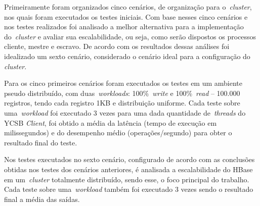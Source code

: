 \documentclass[12pt]{article}
\begin{document}

Primeiramente foram organizados cinco cenários, de organização para o~\emph{cluster}, nos quais foram executados os testes iniciais. Com base nesses cinco cenários e nos testes realizados foi analisado a melhor alternativa para a implementação do~\emph{cluster} e avaliar sua escalabilidade, ou seja, como serão dispostos os processos cliente, mestre e escravo. De acordo com os resultados dessas análises foi idealizado um sexto cenário, considerado o cenário ideal para a configuração do \emph{cluster}.

Para os cinco primeiros cenários foram executados os testes em um ambiente pseudo distribuído, com duas~\emph{workloads}: 100\%~\emph{write} e 100\%~\emph{read} -- 100.000 registros, tendo cada registro 1KB e distribuição uniforme. Cada teste sobre uma~\emph{workload} foi executado 3 vezes para uma dada quantidade de~\emph{threads} do YCSB \textit{Client}, foi obtido a média da latência (tempo de execução em milissegundos) e do desempenho médio (operações/segundo) para obter o resultado final do teste.

Nos testes executados no sexto cenário, configurado de acordo com as conclusões obtidas nos testes dos cenários anteriores, é analisada a escalabilidade do HBase em um~\emph{cluster} totalmente distribuído, sendo esse, o foco principal do trabalho. Cada teste sobre uma~\emph{workload} também foi executado 3 vezes sendo o resultado final a média das saídas.

\end{document}
